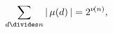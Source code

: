 \[\sum_{d\divides n}|\mathop{\mu\/}\nolimits\!\left(d\right)|=2^{\mathop{\nu\/}%
\nolimits\!\left(n\right)},\]